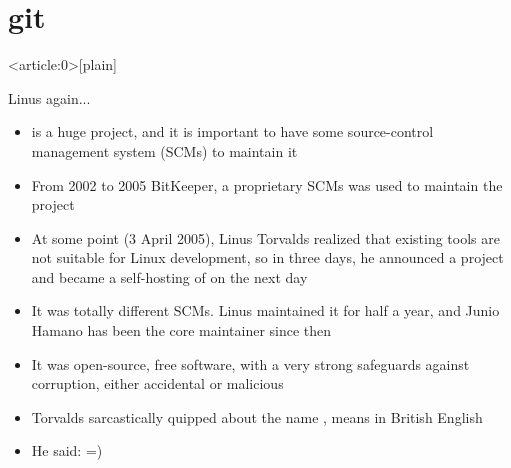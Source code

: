 \documentclass[usenames,dvipsnames,10pt,aspectratio=169]{beamer}
\begin{document}
\section{git}
{ %
    \begin{frame}<article:0>[plain]
     \end{frame}
}

\begin{frame}{Linus again...}
    \begin{itemize}
        \item {} is a huge project, and it is important to have some source-control management system (SCMs) to maintain it
        \item From 2002 to 2005 BitKeeper, a proprietary SCMs was used to maintain the project
        \item At some point (3 April 2005), Linus Torvalds realized that existing tools are not suitable for Linux development, so in three days, he announced a project and became a self-hosting of  on the next day
        \item It was totally different SCMs. Linus maintained it for half a year, and Junio Hamano has been the core maintainer since then
        \item It was open-source, free software, with a very strong safeguards against corruption, either accidental or malicious
        \item Torvalds sarcastically quipped about the name , means  in British English
        \item He said:  =)
    \end{itemize}
\end{frame}
\end{document}
